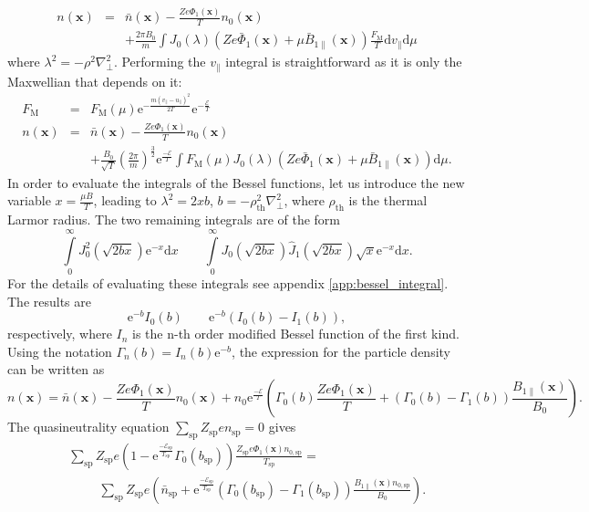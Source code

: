 \documentclass[a4paper,10pt]{article}
\newcommand{\st}[1]{\mathrm{#1}} %
\renewcommand{\vec}[1]{\mathbf{#1}}
\begin{document}
\begin{eqnarray*}
	n(\vec{x}) &=& \bar{n}(\vec{x}) - \frac{Z e \Phi_1(\vec{x})}{T} n_0(\vec{x}) \\
	&& + \frac{2 \pi B_0}{m} \int J_0(\lambda) \left( Z e \bar{\Phi}_1(\vec{x}) + \mu \bar{B}_{1 \parallel}(\vec{x}) \right) \frac{F_{\st{M}}}{T} \mathrm{d}v_{\parallel} \mathrm{d}\mu
\end{eqnarray*}
where $\lambda^2 = - \rho^2 \nabla_{\perp}^2$. Performing the $v_{\parallel}$ integral is straightforward as it is only the Maxwellian that depends on it: 
\begin{eqnarray*}
	F_{\st{M}} &=& F_{\st{M}}(\mu) \mathrm{e}^{-\frac{m (v_{\parallel} - u_{\parallel})^2}{2 T}} \st{e}^{-\frac{\mathcal{E}}{T}} \\
	n(\vec{x}) &=& \bar{n}(\vec{x}) - \frac{Z e \Phi_1(\vec{x})}{T} n_0(\vec{x}) \\
	&& + \frac{B_0}{\sqrt{T}} \left( \frac{2 \pi}{m} \right)^{\frac{3}{2}} \st{e}^{\frac{-\mathcal{E}}{T}} \int F_{\st{M}}(\mu) J_0(\lambda) \left( Z e \bar{\Phi}_1(\vec{x}) + \mu \bar{B}_{1 \parallel}(\vec{x}) \right) \mathrm{d}\mu.
\end{eqnarray*}
In order to evaluate the integrals of the Bessel functions, let us introduce the new variable $x = \frac{\mu B}{T}$, leading to $\lambda^2 = 2 x b$, $b = -\rho_{\st{th}}^2 \nabla^2_{\perp}$, where $\rho_{\st{th}}$ is the thermal Larmor radius. The two remaining integrals are of the form
\[ \int \limits_0^{\infty} J_0^2(\sqrt{2bx}) \mathrm{e}^{-x} \mathrm{d}x \qquad \int \limits_0^{\infty} J_0(\sqrt{2bx}) \hat{J}_1(\sqrt{2bx}) \sqrt{x} \mathrm{e}^{-x} \mathrm{d}x. \]
For the details of evaluating these integrals see appendix \ref{app:bessel_integral}. The results are
\[\mathrm{e}^{-b} I_0(b) \qquad \mathrm{e}^{-b} \left( I_0(b) - I_1(b) \right) ,\]
respectively, where $I_n$ is the n-th order modified Bessel function of the first kind. Using the notation $\Gamma_n(b) = I_n(b) \mathrm{e}^{-b}$, the expression for the particle density can be written as
\[n(\vec{x}) = \bar{n}(\vec{x}) - \frac{Z e \Phi_1(\vec{x})}{T} n_0(\vec{x}) + n_0 \st{e}^{\frac{-\mathcal{E}}{T}} \left( \Gamma_0(b) \frac{Z e \Phi_1(\vec{x})}{T} + (\Gamma_0(b) - \Gamma_1(b)) \frac{B_{1 \parallel}(\vec{x})}{B_0} \right). \]
The quasineutrality equation $\sum_{\st{sp}} Z_{\st{sp}} e n_{\st{sp}} = 0$ gives
\begin{eqnarray}
	&& \sum_{\st{sp}} Z_{\st{sp}} e \left( 1 - \st{e}^{\frac{-\mathcal{E}_{\st{sp}}}{T_{\st{sp}}}} \Gamma_0(b_{\st{sp}}) \right) \frac{Z_{\st{sp}}e \Phi_1(\vec{x}) n_{0,\st{sp}}}{T_{\st{sp}}} =  \nonumber \\
	&& \hspace{1cm} \sum_{\st{sp}} Z_{\st{sp}} e \left( \bar{n}_{\st{sp}} + \st{e}^{\frac{-\mathcal{E}_{\st{sp}}}{T_{\st{sp}}}} (\Gamma_0(b_{\st{sp}}) - \Gamma_1(b_{\st{sp}})) \frac{B_{1 \parallel}(\vec{x}) n_{0,\st{sp}}}{B_0} \right).
	\label{eq:neutrality}
\end{eqnarray}
\end{document}
